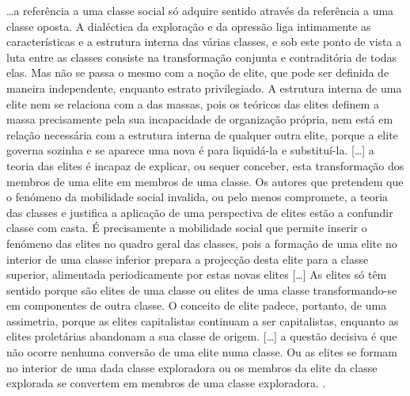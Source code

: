 \begin{citacao}
\dots a referência a uma classe social só adquire sentido através da referência a uma classe oposta. A dialéctica da exploração e da opressão liga intimamente as características e a estrutura interna das várias classes, e sob este ponto de vista a luta entre as classes consiste na transformação conjunta e contraditória de todas elas. Mas não se passa o mesmo com a noção de elite, que pode ser definida de maneira independente, enquanto estrato privilegiado. A estrutura interna de uma elite nem se relaciona com a das massas, pois os teóricos das elites definem a massa precisamente pela sua incapacidade de organização própria, nem está em relação necessária com a estrutura interna de qualquer outra elite, porque a elite governa sozinha e se aparece uma nova é para liquidá-la e substituí-la. [\dots] a teoria das elites é incapaz de explicar, ou sequer conceber, esta transformação dos membros de uma elite em membros de uma classe. Os autores que pretendem que o fenómeno da mobilidade social invalida, ou pelo menos compromete, a teoria das classes e justifica a aplicação de uma perspectiva de elites estão a confundir classe com casta. É precisamente a mobilidade social que permite inserir o fenómeno das elites no quadro geral das classes, pois a formação de uma elite no interior de uma classe inferior prepara a projecção desta elite para a classe superior, alimentada periodicamente por estas novas elites [\dots] As elites só têm sentido porque são elites de uma classe ou elites de uma classe transformando-se em componentes de outra classe. O conceito de elite padece, portanto, de uma assimetria, porque as elites capitalistas continuam a ser capitalistas, enquanto as elites proletárias abandonam a sua classe de origem. [\dots] a questão decisiva é que não ocorre nenhuma conversão de uma elite numa classe. Ou as elites se formam no interior de uma dada classe exploradora ou os membros da elite da classe explorada se convertem em membros de uma classe exploradora. \cite[p.~387-388]{bernardo_fascismo_2015}.
\end{citacao}


